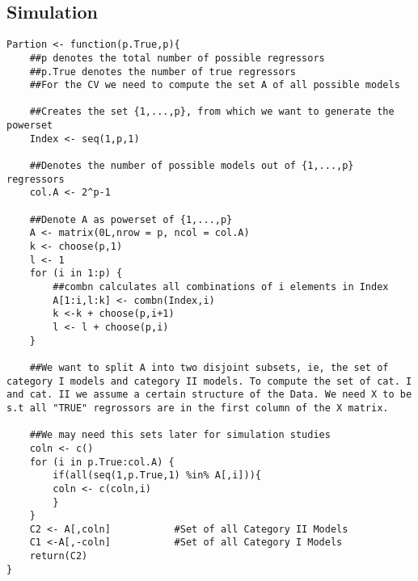 \documentclass[Research_Module_ES.tex]{subfiles}
\begin{document}
\subsection*{Simulation}
\begin{lstlisting}[title={Function inorder to calculate the set of category I and II models }]
Partion <- function(p.True,p){
	##p denotes the total number of possible regressors 
	##p.True denotes the number of true regressors
	##For the CV we need to compute the set A of all possible models 
	
	##Creates the set {1,...,p}, from which we want to generate the powerset
	Index <- seq(1,p,1)                        

	##Denotes the number of possible models out of {1,...,p} regressors 
	col.A <- 2^p-1                                           

	##Denote A as powerset of {1,...,p}
	A <- matrix(0L,nrow = p, ncol = col.A)      
	k <- choose(p,1)
	l <- 1
	for (i in 1:p) {
		##combn calculates all combinations of i elements in Index
		A[1:i,l:k] <- combn(Index,i)             
		k <-k + choose(p,i+1)
		l <- l + choose(p,i)
	}

	##We want to split A into two disjoint subsets, ie, the set of category I models and category II models. To compute the set of cat. I and cat. II we assume a certain structure of the Data. We need X to be s.t all "TRUE" regrossors are in the first column of the X matrix.
	
	##We may need this sets later for simulation studies
	coln <- c()
	for (i in p.True:col.A) {
		if(all(seq(1,p.True,1) %in% A[,i])){    
		coln <- c(coln,i)
		}
	}
	C2 <- A[,coln]           #Set of all Category II Models
	C1 <-A[,-coln]           #Set of all Category I Models
	return(C2)
}
\end{lstlisting}
\end{document}
